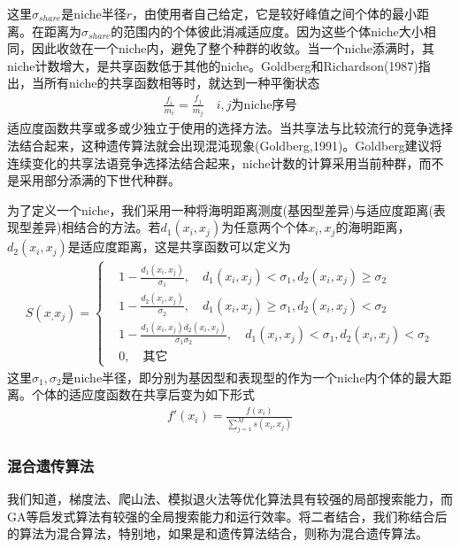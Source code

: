             这里$\sigma_{share}$是niche半径$r$，由使用者自己给定，它是较好峰值之间个体的最小距离。在距离为$\sigma_{share}$的范围内的个体彼此消减适应度。因为这些个体niche大小相同，因此收敛在一个niche内，避免了整个种群的收敛。当一个niche添满时，其niche计数增大，是共享函数低于其他的niche。Goldberg和Richardson(1987)指出，当所有niche的共享函数相等时，就达到一种平衡状态
            \begin{align*}
            \frac{f_i}{m_i} = \frac{f_j}{m_j} \quad i,j\text{为niche序号}
            \end{align*}
            适应度函数共享或多或少独立于使用的选择方法。当共享法与比较流行的竞争选择法结合起来，这种遗传算法就会出现混沌现象(Goldberg,1991)。Goldberg建议将连续变化的共享法语竞争选择法结合起来，niche计数的计算采用当前种群，而不是采用部分添满的下世代种群。
            \par
            为了定义一个niche，我们采用一种将海明距离测度(基因型差异)与适应度距离(表现型差异)相结合的方法。若$d_1(x_i,x_j)$为任意两个个体$x_i,x_j$的海明距离，$d_2(x_i,x_j)$是适应度距离，这是共享函数可以定义为
            \begin{align*}
            S(x_,x_j) =
            \left\{
            \begin{aligned}
            & 1-\frac{d_1(x_i,x_j)}{\sigma_1},\quad d_1(x_i,x_j)<\sigma_1,d_2(x_i,x_j)\geqslant \sigma_2\\
            & 1-\frac{d_2(x_i,x_j)}{\sigma_2},\quad d_1(x_i,x_j)\geqslant\sigma_1,d_2(x_i,x_j)< \sigma_2\\
            & 1-\frac{d_1(x_i,x_j)d_2(x_i,x_j)}{\sigma_1\sigma_2},\quad d_1(x_i,x_j)<\sigma_1,d_2(x_i,x_j)< \sigma_2\\
            & 0,\quad \text{其它}
            \end{aligned}
            \right.
            \end{align*}
            这里$\sigma_1,\sigma_2$是niche半径，即分别为基因型和表现型的作为一个niche内个体的最大距离。个体的适应度函数在共享后变为如下形式
            \begin{align*}
            f'(x_i)=\frac{f(x_i)}{\sum_{j=1}^Ms(x_i,x_j)}
            \end{align*}
        \subsubsection{混合遗传算法}
            \par
            我们知道，梯度法、爬山法、模拟退火法等优化算法具有较强的局部搜索能力，而GA等启发式算法有较强的全局搜索能力和运行效率。将二者结合，我们称结合后的算法为混合算法，特别地，如果是和遗传算法结合，则称为混合遗传算法。

